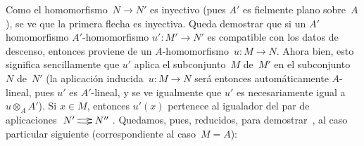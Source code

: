 Como
el homomorfismo~$N\to N'$ es inyectivo (pues $A'$ es fielmente plano
sobre~$A$), se ve que la primera flecha es inyectiva. Queda demostrar que
si un
{$A'$ homomorfismo}
{$A'$-homomorfismo}
$u'\colon M'\to N'$ es compatible con los datos de descenso, entonces
proviene de un $A$-homomorfismo~$u\colon M\to N$. Ahora bien, esto
significa sencillamente que $u'$ aplica el subconjunto~$M$ de~$M'$ en el
subconjunto~$N$ de~$N'$ (la aplicación inducida~$u\colon M\to N$ será
entonces automáticamente $A$-lineal, pues $u'$ es $A'$-lineal, y se ve
igualmente que $u'$ es necesariamente igual a~$u\otimes_{A}A'$). Si
$x\in M$, entonces $u'(x)$ pertenece al igualador del par de aplicaciones
$\xymatrix@C=.5cm{N'\ar@/^2pt/[r]\ar@/_2pt/[r] & N''}$. Quedamos, pues,
reducidos, para demostrar~,
al caso particular siguiente (correspondiente al caso~$M=A$):
